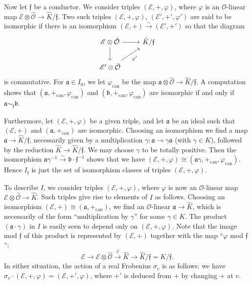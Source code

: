 \documentclass[12pt,a4paper]{article}
\theoremstyle{plain}
\theoremstyle{definition}
\newcommand{\OO}{\mathcal{O}}
\newcommand{\ff}{\mathfrak{f}}
\newcommand{\can}{\mathrm{can}}
\begin{document}
Now let $\ff$ be a conductor. We consider triples $(\mathscr{E},+,\varphi)$, where $\varphi$ is an $\OO$-linear map $\mathscr{E}\otimes\hat{\OO}\to\hat{K}/\ff$. Two such triples $(\mathscr{E},+,\varphi)$, $(\mathscr{E}',+',\varphi')$ are said to be isomorphic if there is an isomorphism $(\mathscr{E},+)\xrightarrow{\sim}(\mathscr{E}',+')$ so that the diagram
\[
\begin{tikzcd}
\mathscr{E}\otimes\hat{\OO}\arrow[r]\arrow[d] & \hat{K}/\ff\\
\mathscr{E}'\otimes\hat{\OO}\arrow[ur, "\varphi'"'] &
\end{tikzcd}
\]
is commutative. For $\mathfrak{a}\in I_0$, we let $\varphi_{\can}$ be the map $\mathfrak{a}\otimes\hat{\OO}\to\hat{K}/\ff$. A computation shows that $(\mathfrak{a},+_{\can},\varphi_{\can})$ and $(\mathfrak{b},+_{\can},\varphi_{\can})$ are isomorphic if and only if $\mathfrak{a}\sim_{\ff}\mathfrak{b}$.

Furthermore, let $(\mathscr{E},+,\varphi)$ be a given triple, and let $\mathfrak{a}$ be an ideal such that $(\mathscr{E},+)$ and $(\mathfrak{a},+_{\can})$ are isomorphic. Choosing an isomorphism we find a map $\mathfrak{a}\to\hat{K}/\ff$, necessarily given by a multiplication $\gamma:\mathfrak{a}\to\gamma\mathfrak{a}$ (with $\gamma\in K$), followed by the reduction $\hat{K}\to\hat{K}/\ff$. We may choose $\gamma$ to be totally positive. Then the isomorphism $\mathfrak{a}\gamma^{-1}\xrightarrow{\sim}\mathfrak{b}\cdot\ff^{-1}$ shows that we have $(\mathscr{E},+,\varphi)\cong(\mathfrak{a}\gamma,+_{\can},\varphi_{\can})$. Hence $I_{\ff}$ is just the set of isomorphism classes of triples $(\mathscr{E},+,\varphi)$.

To describe $I$, we consider triples $(\mathscr{E},+,\varphi)$, where $\varphi$ is now an $\OO$-linear map $\mathscr{E}\otimes\hat{\OO}\to\hat{K}$. Such triples give rise to elements of $I$ as follows. Choosing an isomorphism $(\mathscr{E},+)\cong(\mathfrak{a},+_{\can})$, we find an $\OO$-linear $\mathfrak{a}\to\hat{K}$, which is necessarily of the form ``multiplication by $\gamma$'' for some $\gamma\in K$. The product $(\mathfrak{a}\cdot\gamma)$ in $I$ is easily seen to depend only on $(\mathscr{E},+,\varphi)$. Note that the image mod $\ff$ of this product is represented by $(\mathscr{E},+)$ together with the map ``$\varphi$ mod $\ff$'':
\[
\mathscr{E}\to\mathscr{E}\otimes\hat{\OO}\xrightarrow{\varphi}\hat{K}\to\hat{K}/\ff=K/\ff.
\]
In either situation, the action of a real Frobenius $\sigma_v$ is as follows: we have $\sigma_v\cdot(\mathscr{E},+,\varphi)=(\mathscr{E},+',\varphi)$, where $+'$ is deduced from $+$ by changing $+$ at $v$.
\end{document}
